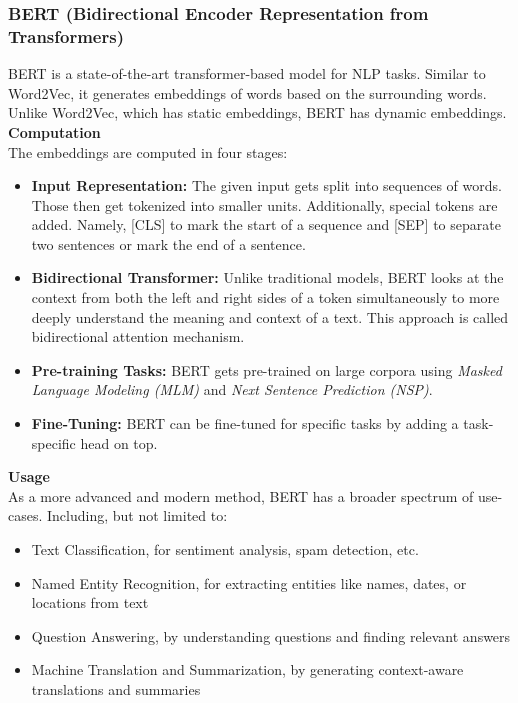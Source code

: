 \documentclass[a4paper,12pt]{article}
\begin{document}
\subsubsection{BERT (Bidirectional Encoder Representation from Transformers)}
BERT is a state-of-the-art transformer-based model for NLP tasks. Similar to Word2Vec, it generates embeddings of words based on the surrounding words. Unlike Word2Vec, which has static embeddings, BERT has dynamic embeddings. \\

\noindent \textbf{Computation}\\
The embeddings are computed in four stages:
\begin{itemize}
    \item \textbf{Input Representation:} The given input gets split into sequences of words. Those then get tokenized into smaller units. Additionally, special tokens are added. Namely, [CLS] to mark the start of a sequence and [SEP] to separate two sentences or mark the end of a sentence. 
    \item \textbf{Bidirectional Transformer:} Unlike traditional models, BERT looks at the context from both the left and right sides of a token simultaneously to more deeply understand the meaning and context of a text. This approach is called bidirectional attention mechanism. 
    \item \textbf{Pre-training Tasks:} BERT gets pre-trained on large corpora using \textit{Masked Language Modeling (MLM)} and \textit{Next Sentence Prediction (NSP)}. 
    \item \textbf{Fine-Tuning:} BERT can be fine-tuned for specific tasks by adding a task-specific head on top.
\end{itemize}

\noindent \textbf{Usage}\\
As a more advanced and modern method, BERT has a broader spectrum of use-cases. Including, but not limited to:
\begin{itemize}
    \item Text Classification, for sentiment analysis, spam detection, etc.
    \item Named Entity Recognition, for extracting entities like names, dates, or locations from text
    \item Question Answering, by understanding questions and finding relevant answers
    \item Machine Translation and Summarization, by generating context-aware translations and summaries
\end{itemize}
\end{document}
